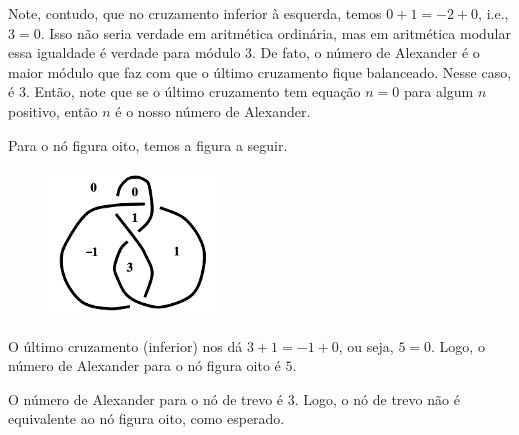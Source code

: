 	Note, contudo, que no cruzamento inferior à esquerda, temos $0+1=-2+0$, i.e., $3=0$. 
	Isso não seria verdade em aritmética ordinária, mas em aritmética modular essa igualdade 
	é verdade para módulo $3$. De fato, o número de Alexander é o maior módulo que faz com 
	que o último cruzamento fique balanceado. Nesse caso, é $3$. Então, note que se o último 
	cruzamento tem equação $n=0$ para algum $n$ positivo, então $n$ é o nosso número de Alexander.
	
	\par\vspace{0.3cm} Para o nó figura oito, temos a figura a seguir.
	\begin{figure}[H]
	\label{no de oito preenchido}
		\begin{center}
			\includegraphics[width=4.5cm]{Images/no_de_oito_preenchido.png}
		\end{center}
	\end{figure}
	O último cruzamento (inferior) nos dá $3+1=-1+0$, ou seja, $5=0$. Logo, o número de 
	Alexander para o nó figura oito é $5$.
	
	\par\vspace{0.3cm} O número de Alexander para o nó de trevo é $3$. 
	Logo, o nó de trevo não é equivalente ao nó figura oito, como esperado.
	

